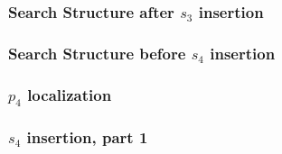 \documentclass{beamer}
\begin{document}
\begin{frame}
    \frametitle{Search Structure after ${s_3}$ insertion}

    \begin{figure}
        \begin{minipage}[h]{0.39\linewidth}
        \end{minipage}
        \begin{minipage}[h]{0.59\linewidth}
        \end{minipage}
    \end{figure}
\end{frame}

\begin{frame}
    \frametitle{Search Structure before ${s_4}$ insertion}

    \begin{figure}
        \begin{minipage}[h]{0.39\linewidth}
        \end{minipage}
        \begin{minipage}[h]{0.59\linewidth}
        \end{minipage}
    \end{figure}
\end{frame}

\begin{frame}
    \frametitle{${p_4}$ localization}

    \begin{figure}
        \begin{minipage}[h]{0.39\linewidth}
        \end{minipage}
        \begin{minipage}[h]{0.59\linewidth}
        \end{minipage}
    \end{figure}
\end{frame}

\begin{frame}
    \frametitle{${s_4}$ insertion, part 1}

    \begin{figure}
        \begin{minipage}[h]{0.39\linewidth}
        \end{minipage}
        \begin{minipage}[h]{0.59\linewidth}
        \end{minipage}
    \end{figure}
\end{frame}
\end{document}
